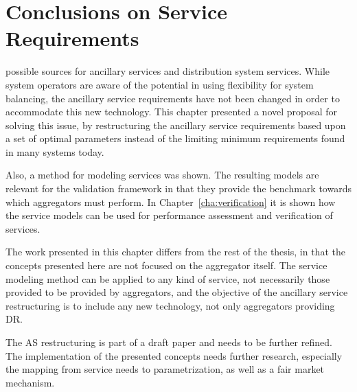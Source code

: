
\section{Conclusions on Service Requirements} %
\label{sec:ConclusionsServiceRequirements}
 possible sources for ancillary services and distribution system services. While system operators are aware of the potential in using flexibility for system balancing, the ancillary service requirements have not been changed in order to accommodate this new technology. This chapter presented a novel proposal for solving this issue, by restructuring the ancillary service requirements based upon a set of optimal parameters instead of the limiting minimum requirements found in many systems today.

Also, a method for modeling services was shown. The resulting models are relevant for the validation framework in that they provide the benchmark towards which aggregators must perform. In Chapter~\ref{cha:verification} it is shown how the service models can be used for performance assessment and verification of services.

The work presented in this chapter differs from the rest of the thesis, in that the concepts presented here are not focused on the aggregator itself. The service modeling method can be applied to any kind of service, not necessarily those provided to be provided by aggregators, and the objective of the ancillary service restructuring is to include any new technology, not only aggregators providing DR.

The AS restructuring is part of a draft paper and needs to be further refined. The implementation of the presented concepts needs further research, especially the mapping from service needs to parametrization, as well as a fair market mechanism.


